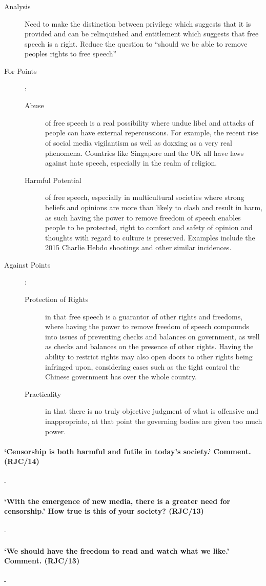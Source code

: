 \documentclass[../../main]{subfiles}
\begin{document}
\begin{description}
	\item[Analysis] Need to make the distinction between privilege which suggests that it is provided and can be relinquished and entitlement which suggests that free speech is a right. Reduce the question to ``should we be able to remove peoples rights to free speech''
	\item[For Points] :
		\begin{description}
			\item[Abuse] of free speech is a real possibility where undue libel and attacks of people can have external repercussions. For example, the recent rise of social media vigilantism as well as doxxing as a very real phenomena. Countries like Singapore and the UK all have laws against hate speech, especially in the realm of religion.
			\item[Harmful Potential] of free speech, especially in multicultural societies where strong beliefs and opinions are more than likely to clash and result in harm, as such having the power to remove freedom of speech enables people to be protected, right to comfort and safety of opinion and thoughts with regard to culture is preserved. Examples include the 2015 Charlie Hebdo shootings and other similar incidences.
		\end{description}
	\item[Against Points] :
		\begin{description}
			\item[Protection of Rights] in that free speech is a guarantor of other rights and freedoms, where having the power to remove freedom of speech compounds into issues of preventing checks and balances on government, as well as checks and balances on the presence of other rights. Having the ability to restrict rights may also open doors to other rights being infringed upon, considering cases such as the tight control the Chinese government has over the whole country.
			\item[Practicality] in that there is no truly objective judgment of what is offensive and inappropriate, at that point the governing bodies are given too much power. 
		\end{description}
\end{description}

\paragraph{`Censorship is both harmful and futile in today's society.' Comment. (RJC/14)}-

\paragraph{`With the emergence of new media, there is a greater need for censorship.' How true is this of your society? (RJC/13)}-

\paragraph{`We should have the freedom to read and watch what we like.' Comment. (RJC/13)}-	
\end{document}
